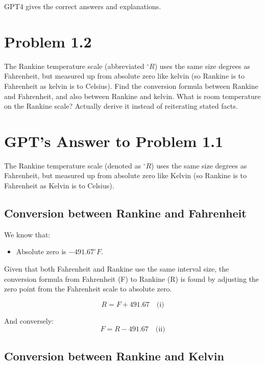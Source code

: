 \documentclass[12pt]{article}
\begin{document}
GPT4 gives the correct answers and explanations.

\section*{Problem 1.2}

The Rankine temperature scale (abbreviated $^\circ R$) uses the same
size degrees as Fahrenheit, but measured up from absolute zero like kelvin (so
Rankine is to Fahrenheit as kelvin is to Celsius). Find the conversion formula
between Rankine and Fahrenheit, and also between Rankine and kelvin. What is
room temperature on the Rankine scale? Actually derive it instead of reiterating stated facts.

\section*{GPT's Answer to Problem 1.1}


The Rankine temperature scale (denoted as $^\circ R$) uses the same size degrees as Fahrenheit, but measured up from absolute zero like Kelvin (so Rankine is to Fahrenheit as Kelvin is to Celsius).

\subsection*{Conversion between Rankine and Fahrenheit}

We know that:
\begin{itemize}
    \item Absolute zero is $-491.67^\circ F$.
\end{itemize}

Given that both Fahrenheit and Rankine use the same interval size, the conversion formula from Fahrenheit (F) to Rankine (R) is found by adjusting the zero point from the Fahrenheit scale to absolute zero.

\begin{equation}
    R = F + 491.67 \quad \text{(i)}
\end{equation}

And conversely:
\begin{equation}
    F = R - 491.67 \quad \text{(ii)}
\end{equation}

\subsection*{Conversion between Rankine and Kelvin}
\end{document}
